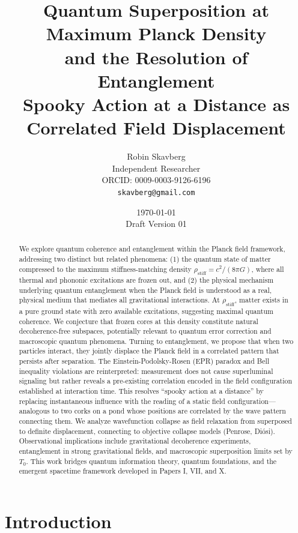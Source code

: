 \documentclass[11pt,a4paper]{article}
\title{\textbf{Quantum Superposition at Maximum Planck Density\\
and the Resolution of Entanglement}\\[0.5em]
\large Spooky Action at a Distance as Correlated Field Displacement}
\author{Robin Skavberg\\[0.3em]
\small Independent Researcher\\
\small ORCID: 0009-0003-9126-6196\\
\small \texttt{skavberg@gmail.com}}
\date{\today\\[0.5em]
\small Draft Version 01}
\newcommand{\rhostiff}{\ensuremath{\rho_{\mathrm{stiff}}}}
\newcommand{\Tzero}{\ensuremath{T_0}}
\theoremstyle{definition}
\theoremstyle{remark}
\begin{document}
\maketitle

\begin{abstract}
We explore quantum coherence and entanglement within the Planck field framework, addressing two distinct but related phenomena: (1) the quantum state of matter compressed to the maximum stiffness-matching density $\rhostiff = c^2/(8\pi G)$, where all thermal and phononic excitations are frozen out, and (2) the physical mechanism underlying quantum entanglement when the Planck field is understood as a real, physical medium that mediates all gravitational interactions. At $\rhostiff$, matter exists in a pure ground state with zero available excitations, suggesting maximal quantum coherence. We conjecture that frozen cores at this density constitute natural decoherence-free subspaces, potentially relevant to quantum error correction and macroscopic quantum phenomena. Turning to entanglement, we propose that when two particles interact, they jointly displace the Planck field in a correlated pattern that persists after separation. The Einstein-Podolsky-Rosen (EPR) paradox and Bell inequality violations are reinterpreted: measurement does not cause superluminal signaling but rather reveals a pre-existing correlation encoded in the field configuration established at interaction time. This resolves ``spooky action at a distance'' by replacing instantaneous influence with the reading of a static field configuration---analogous to two corks on a pond whose positions are correlated by the wave pattern connecting them. We analyze wavefunction collapse as field relaxation from superposed to definite displacement, connecting to objective collapse models (Penrose, Di\'osi). Observational implications include gravitational decoherence experiments, entanglement in strong gravitational fields, and macroscopic superposition limits set by $\Tzero$. This work bridges quantum information theory, quantum foundations, and the emergent spacetime framework developed in Papers I, VII, and X.
\end{abstract}

\tableofcontents
\newpage

\section{Introduction}
\label{sec:introduction}
\end{document}
